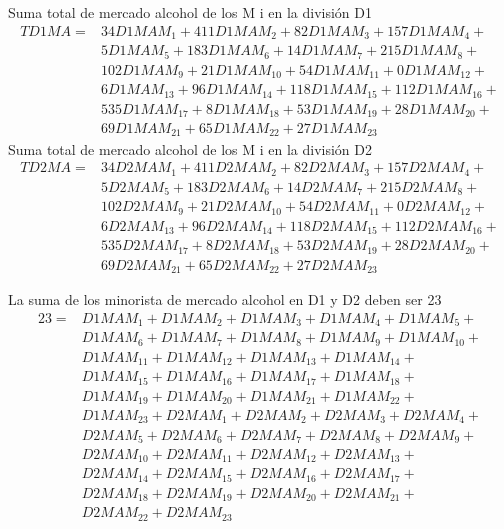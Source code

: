 Suma total de mercado alcohol de los M i en la división D1
\begin{equation*}
\begin{split}
  TD1MA = & 34  D1MAM_1 + 411 D1MAM_2 + 82 D1MAM_3 + 157 D1MAM_4 + \\ 
  		  &  5  D1MAM_5 + 183 D1MAM_6 + 14 D1MAM_7 + 215 D1MAM_8 + \\
  		  & 102 D1MAM_9 + 21  D1MAM_{10} + 54 D1MAM_{11} + 0 D1MAM_{12} + \\ 
  		  &  6 D1MAM_{13} + 96 D1MAM_{14} + 118 D1MAM_{15} + 112 D1MAM_{16} + \\ 
  		  & 535 D1MAM_{17} + 8 D1MAM_{18} +  53 D1MAM_{19} + 28 D1MAM_{20} + \\
		  & 69 D1MAM_{21} + 65 D1MAM_{22} + 27 D1MAM_{23} 
\end{split}
\end{equation*}
Suma total de mercado alcohol de los M i en la división D2
\begin{equation*}
\begin{split}
  TD2MA = & 34 D2MAM_1 + 411 D2MAM_2 + 82 D2MAM_3 + 157 D2MAM_4 + \\ 
  		  & 5 D2MAM_5 + 183 D2MAM_6 + 14 D2MAM_7 + 215 D2MAM_8 + \\
  		  & 102 D2MAM_9 + 21 D2MAM_{10} + 54 D2MAM_{11} + 0 D2MAM_{12} + \\ 
  		  & 6 D2MAM_{13} + 96 D2MAM_{14} + 118 D2MAM_{15} + 112 D2MAM_{16} + \\ 
  		  & 535 D2MAM_{17} + 8 D2MAM_{18} +  53 D2MAM_{19} + 28 D2MAM_{20} + \\
		  & 69 D2MAM_{21} + 65 D2MAM_{22} + 27 D2MAM_{23} 
\end{split}
\end{equation*}

La suma de los minorista de mercado alcohol en D1 y D2 deben ser 23
\begin{equation*}
\begin{split}
23 =  	&  D1MAM_1 + D1MAM_2 + D1MAM_3 + D1MAM_4 + D1MAM_5 +\\ 
      	&  D1MAM_6 + D1MAM_7 + D1MAM_8 + D1MAM_9 + D1MAM_{10} +\\
  		&  D1MAM_{11} + D1MAM_{12} + D1MAM_{13} + D1MAM_{14} +\\ 
  		&  D1MAM_{15} + D1MAM_{16} + D1MAM_{17} + D1MAM_{18} + \\ 
  		&  D1MAM_{19} + D1MAM_{20} + D1MAM_{21} + D1MAM_{22} + \\
		&  D1MAM_{23} + D2MAM_1 + D2MAM_2 + D2MAM_3 + D2MAM_4 +\\
		&  D2MAM_5 + D2MAM_6 + D2MAM_7 + D2MAM_8 + D2MAM_9 + \\
		&  D2MAM_{10} + D2MAM_{11} + D2MAM_{12} +  D2MAM_{13} + \\
		&  D2MAM_{14} + D2MAM_{15} + D2MAM_{16} + D2MAM_{17} + \\
		&  D2MAM_{18} + D2MAM_{19} + D2MAM_{20} + D2MAM_{21} + \\
		&  D2MAM_{22} + D2MAM_{23}\\
\end{split}
\end{equation*}




